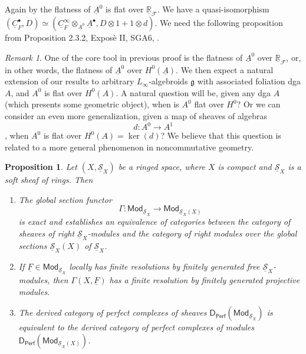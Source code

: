 \documentclass[12pt]{amsart}
\newtheorem{prop}[thm]{Proposition}
\theoremstyle{definition}
\theoremstyle{remark}
\newtheorem{rem}[thm]{Remark}
\numberwithin{equation}{section}
\newcommand{\CF}{{\mathcal F}}
\newcommand{\A}{{A}}
\newcommand{\R}{{\mathbb{R}}}
\newcommand{\1}{{\mathbb{1}}}
\newcommand{\g}{\mathfrak{g}}
\newcommand{\Mod}{\mathsf{Mod}}
\newcommand{\dperf}{\mathsf{D_{Perf}}}
\begin{document}
Again by the flatness of $\underline{\A}^0$ is flat over $\underline{\R}_{\CF}$. We have a quasi-isomorphism $(\underline{C}_{F}^{\bullet}, D) \simeq (\underline{C}_{F}^{\infty}\otimes_{\underline{\A}^0} \underline{\A}^{\bullet}, D\otimes 1 + 1 \otimes d)$. We need the following proposition from Proposition 2.3.2, Expos\`{e} II, SGA6, \cite{Ber06}. 
\begin{rem}
    One of the core tool in previous proof is the flatness of $\underline{\A}^0$  over $\underline{\R}_{\CF}$, or, in other words, 
    the flatness of $\underline{\A}^0$  over $H^0(\underline{\A})$. We then expect a natural extension of our results to arbitrary $L_{\infty}$-algebroids $\g$ with associated foliation dga $A$, and $A^0$ is flat over $H^0(A)$. A natural question will be, given any dga $A$ (which presents some geometric object), when is $A^0$ flat over $H^0$? Or we can consider an even more generalization, given a map of sheaves of algebras
    $$d:A^0 \to A^1$$,
    when $A^0$ is flat over $H^0(A) = \ker(d)$?
    We believe that this question is related to a more general phenomenon in noncommutative geometry. 
\end{rem}
\begin{prop}
Let $(X, \underline{\mathcal{S}}_X)$ be a ringed space, where $X$ is compact and $\underline{\mathcal{S}}_X$ is a soft sheaf of rings. Then
\begin{enumerate}
    \item The global section functor
    $$ \Gamma: \Mod_{\underline{\mathcal{S}}_X} \to \Mod_{\underline{\mathcal{S}}_X(X)}
    $$ is exact and establishes an equivalence of categories between the category of sheaves of right $\underline{\mathcal{S}}_X$-modules and the category of right modules over the global sections $\underline{\mathcal{S}}_X(X)$ of $\underline{\mathcal{S}}_X$.
    \item If $\underline{F} \in \Mod_{\underline{\mathcal{S}}_X}$ locally has finite resolutions by finitely generated free $\underline{\mathcal{S}}_X$-modules, then $\Gamma(X, \underline{F})$ has a finite resolution by finitely generated projective modules.
    \item The derived category of perfect complexes of sheaves $\dperf(\Mod_{\underline{\mathcal{S}}_X})$ is equivalent to the derived category of perfect complexes of modules $\dperf(\Mod_{\underline{\mathcal{S}}_X(X)})$.
    
\end{enumerate}
\end{prop}
\end{document}
